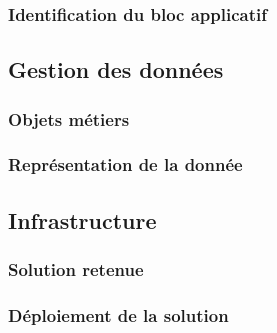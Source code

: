 \subsubsection{Identification du bloc applicatif}


\subsection{Gestion des données}

\subsubsection{Objets métiers}


\subsubsection{Représentation de la donnée}


\subsection{Infrastructure}

\subsubsection{Solution retenue}


\subsubsection{Déploiement de la solution}

